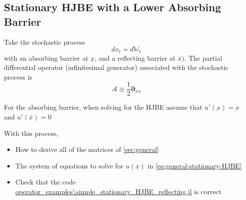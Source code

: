 \documentclass[11pt]{article}
\newcommand{\D}[1][]{\ensuremath{\boldsymbol{\partial}_{#1}}}
\newcommand{\W}{\ensuremath{\mathbb{W}}}
\newcommand{\A}{\ensuremath{\mathcal{A}}}
\begin{document}
\subsection{Stationary HJBE with a Lower Absorbing Barrier}
Take the stochastic process
$$
d x_t = d \W_t
$$
with an absorbing barrier at $\underline{x}$, and a reflecting barrier at $\bar{x})$.  The partial differential operator (infinitesimal generator) associated with the stochastic process is
$$
\A \equiv \frac{1}{2}\D[xx]
$$

For the absorbing barrier, when solving for the HJBE assume that $u'(\underbar{x}) = \underbar{x}$ and $u'(\bar{x}) = 0$


With this process,
\begin{itemize}
	\item How to derive all of the matrices of \cref{sec:general}
	\item The system of equations to solve for $u(x)$ in \cref{eq:general-stationary-HJBE}
	\item Check that the code \url{operator_examples\simple_stationary_HJBE_reflecting.jl} is correct
\end{itemize}
\end{document}
